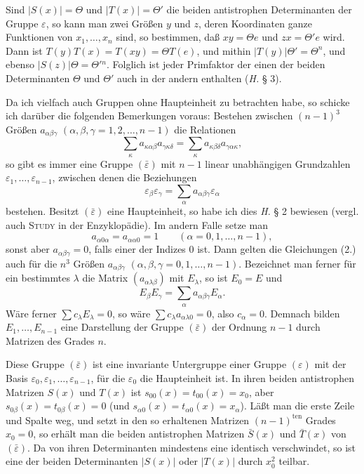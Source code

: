 \documentclass[11pt]{article}
\newcommand{\eps}{\varepsilon}
\newcommand{\ten}{\mathrm{ten}}
\begin{document}
Sind $|S(x)|=\Theta$ und $|T(x)|=\Theta'$ die beiden antistrophen Determinanten der Gruppe $\eps$, so kann man zwei Größen $y$ und $z$, deren Koordinaten ganze Funktionen von $x_1,\ldots,x_n$ sind, so bestimmen, daß $xy=\Theta e$ und $zx=\Theta'e$ wird. Dann ist $T(y)T(x)=T(xy)=\Theta T(e)$, und mithin $|T(y)|\Theta'=\Theta^n$, und ebenso $|S(z)|\Theta=\Theta'{}^n$. Folglich ist jeder Primfaktor der einen der beiden Determinanten $\Theta$ und $\Theta'$ auch in der andern enthalten (\emph{H.} § 3).

Da ich vielfach auch Gruppen ohne Haupteinheit zu betrachten habe, so schicke ich darüber die folgenden Bemerkungen voraus: Bestehen zwischen $(n-1)^3$ Größen $a_{\alpha\beta\gamma}$ $(\alpha,\beta,\gamma=1,2,\ldots,n-1)$ die Relationen
\begin{equation}\tag{2.}
 \sum_{\kappa} a_{\kappa\alpha\beta}a_{\gamma\kappa\delta}
 =\sum_{\kappa} a_{\kappa\beta\delta}a_{\gamma\alpha\kappa},
\end{equation}
so gibt es immer eine Gruppe $(\bar\eps)$ mit $n-1$ linear unabhängigen Grundzahlen $\eps_1,\ldots,\eps_{n-1}$, zwischen denen die Beziehungen
\begin{equation}\tag{3.}
 \eps_{\beta}\eps_{\gamma}=\sum_{\alpha}a_{\alpha\beta\gamma}\eps_{\alpha}
\end{equation}
bestehen. Besitzt $(\bar\eps)$ eine Haupteinheit, so habe ich dies \emph{H.} § 2 bewiesen (vergl. auch \textsc{Study} in der Enzyklopädie). Im andern Falle setze man
\begin{equation}\tag{4.}
 a_{\alpha0\alpha}=a_{\alpha\alpha0}=1\qquad(\alpha=0,1,\ldots,n-1),
\end{equation}
sonst aber $a_{\alpha\beta\gamma}=0$, falls einer der Indizes $0$ ist. Dann gelten die Gleichungen (2.) auch für die $n^3$ Größen $a_{\alpha\beta\gamma}$ $(\alpha,\beta,\gamma=0,1,\ldots,n-1)$. Bezeichnet man ferner für ein bestimmtes $\lambda$ die Matrix $(a_{\alpha\lambda\beta})$ mit $E_{\lambda}$, so ist $E_0=E$ und
\begin{equation}\tag{5.}
 E_{\beta}E_{\gamma}=\sum_{\alpha}a_{\alpha\beta\gamma}E_{\alpha}.
\end{equation}
Wäre ferner $\sum c_{\lambda}E_{\lambda}=0$, so wäre $\sum c_{\lambda}a_{\alpha\lambda0}=0$, also $c_{\alpha}=0$. Demnach bilden $E_1,\ldots,E_{n-1}$ eine Darstellung der Gruppe $(\bar\eps)$ der Ordnung $n-1$ durch Matrizen des Grades $n$.

Diese Gruppe $(\bar\eps)$ ist eine invariante Untergruppe einer Gruppe $(\eps)$ mit der Basis $\eps_0,\eps_1,\ldots,\eps_{n-1}$, für die $\eps_0$ die Haupteinheit ist. In ihren beiden antistrophen Matrizen $S(x)$ und $T(x)$ ist $s_{00}(x)=t_{00}(x)=x_0$, aber $s_{0\beta}(x)=t_{0\beta}(x)=0$ (und $s_{\alpha0}(x)=t_{\alpha0}(x)=x_{\alpha}$). Läßt man die erste Zeile und Spalte weg, und setzt in den so erhaltenen Matrizen $(n-1)^{\ten}$ Grades $x_0=0$, so erhält man die beiden antistrophen Matrizen $\bar S(x)$ und $\bar T(x)$ von $(\bar\eps)$. Da von ihren Determinanten mindestens eine identisch verschwindet, so ist eine der beiden Determinanten $|S(x)|$ oder $|T(x)|$ durch $x_0^2$ teilbar.
\end{document}
